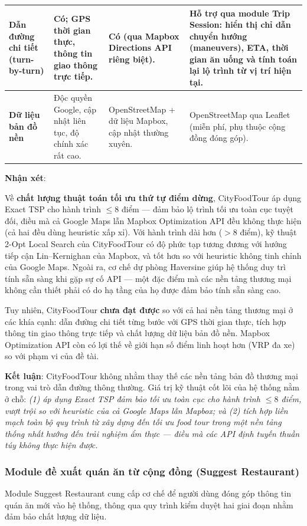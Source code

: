 \begin{longtable}{|p{3cm}|p{3.5cm}|p{3.5cm}|p{3.5cm}|}
\textbf{Dẫn đường chi tiết (turn-by-turn)} &
Có; GPS thời gian thực, thông tin giao thông trực tiếp. &
Có (qua Mapbox Directions API riêng biệt). &
Hỗ trợ qua module Trip Session: hiển thị chỉ dẫn chuyển hướng (maneuvers), ETA, thời gian ăn uống và tính toán lại lộ trình từ vị trí hiện tại. \\ \hline

\textbf{Dữ liệu bản đồ nền} &
Độc quyền Google, cập nhật liên tục, độ chính xác rất cao. &
OpenStreetMap + dữ liệu Mapbox, cập nhật thường xuyên. &
OpenStreetMap qua Leaflet (miễn phí, phụ thuộc cộng đồng đóng góp). \\ \hline

\end{longtable}

\newpage
\textbf{Nhận xét}:

Về \textbf{chất lượng thuật toán tối ưu thứ tự điểm dừng}, CityFoodTour áp dụng Exact TSP cho
hành trình $\le 8$ điểm — đảm bảo lộ trình tối ưu toàn cục tuyệt đối, điều mà cả Google Maps
lẫn Mapbox Optimization API đều không thực hiện (cả hai đều dùng heuristic xấp xỉ).
Với hành trình dài hơn ($> 8$ điểm), kỹ thuật 2-Opt Local Search của CityFoodTour
có độ phức tạp tương đương với hướng tiếp cận Lin–Kernighan của Mapbox, và tốt hơn
so với heuristic không tinh chỉnh của Google Maps. Ngoài ra, cơ chế dự phòng Haversine
giúp hệ thống duy trì tính sẵn sàng khi gặp sự cố API — một đặc điểm mà các nền tảng
thương mại không cần thiết phải có do hạ tầng của họ được đảm bảo tính sẵn sàng cao.

Tuy nhiên, CityFoodTour \textbf{chưa đạt được} so với cả hai nền tảng thương mại ở các khía cạnh:
dẫn đường chi tiết từng bước với GPS thời gian thực, tích hợp thông tin giao thông trực tiếp
và chất lượng dữ liệu bản đồ nền. Mapbox Optimization API còn có lợi thế về giới hạn
số điểm linh hoạt hơn (VRP đa xe) so với phạm vi của đề tài.

\textbf{Kết luận}: CityFoodTour không nhằm thay thế các nền tảng bản đồ thương mại trong vai trò
dẫn đường thông thường. Giá trị kỹ thuật cốt lõi của hệ thống nằm ở chỗ:
\textit{(1) áp dụng Exact TSP đảm bảo tối ưu toàn cục cho hành trình $\le 8$ điểm,
vượt trội so với heuristic của cả Google Maps lẫn Mapbox; và
(2) tích hợp liền mạch toàn bộ quy trình từ xây dựng đến tối ưu food tour
trong một nền tảng thống nhất hướng đến trải nghiệm ẩm thực — điều mà các API
định tuyến thuần túy không thực hiện được.}

\subsubsection{Module đề xuất quán ăn từ cộng đồng (Suggest Restaurant)}
Module Suggest Restaurant cung cấp cơ chế để người dùng đóng góp thông tin quán ăn mới vào hệ thống, thông qua quy trình kiểm duyệt hai giai đoạn nhằm đảm bảo chất lượng dữ liệu.

